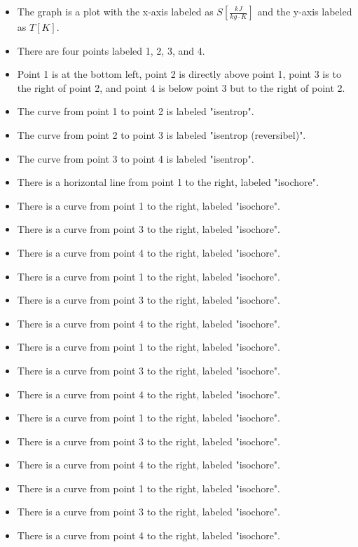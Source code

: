 \begin{itemize}
    \item The graph is a plot with the x-axis labeled as \( S \left[ \frac{kJ}{kg \cdot K} \right] \) and the y-axis labeled as \( T [K] \).
    \item There are four points labeled 1, 2, 3, and 4.
    \item Point 1 is at the bottom left, point 2 is directly above point 1, point 3 is to the right of point 2, and point 4 is below point 3 but to the right of point 2.
    \item The curve from point 1 to point 2 is labeled "isentrop".
    \item The curve from point 2 to point 3 is labeled "isentrop (reversibel)".
    \item The curve from point 3 to point 4 is labeled "isentrop".
    \item There is a horizontal line from point 1 to the right, labeled "isochore".
    \item There is a curve from point 1 to the right, labeled "isochore".
    \item There is a curve from point 3 to the right, labeled "isochore".
    \item There is a curve from point 4 to the right, labeled "isochore".
    \item There is a curve from point 1 to the right, labeled "isochore".
    \item There is a curve from point 3 to the right, labeled "isochore".
    \item There is a curve from point 4 to the right, labeled "isochore".
    \item There is a curve from point 1 to the right, labeled "isochore".
    \item There is a curve from point 3 to the right, labeled "isochore".
    \item There is a curve from point 4 to the right, labeled "isochore".
    \item There is a curve from point 1 to the right, labeled "isochore".
    \item There is a curve from point 3 to the right, labeled "isochore".
    \item There is a curve from point 4 to the right, labeled "isochore".
    \item There is a curve from point 1 to the right, labeled "isochore".
    \item There is a curve from point 3 to the right, labeled "isochore".
    \item There is a curve from point 4 to the right, labeled "isochore".

\end{itemize}
